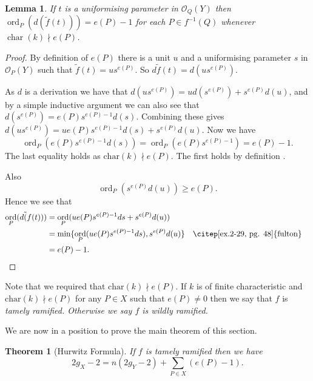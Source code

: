 \documentclass[11pt]{article} %
\newtheorem{thm}{Theorem}
\newtheorem{lem}{Lemma}
\DeclareMathOperator{\ord}{ord}
\DeclareMathOperator{\cha}{char}
\begin{document}
\begin{lem}
	If $t$ is a uniformising parameter in $\mathscr{O}_{Q}(Y)$ then $\ord_{P}(d(\tilde{f}(t)))=e(P)-1$ 	for each $P\in f^{-1}(Q)$ whenever $\cha(k)\nmid e(P)$.
\end{lem}
\begin{proof}
	By definition of $e(P)$ there is a unit $u$ and a uniformising parameter $s$ in $\mathscr{O}_{P}		(Y)$ such that $\tilde{f}(t)=us^{e(P)}$. So $d\tilde{f}(t)=d(us^{e(P)})$.

	As $d$ is a derivation we have that $d(us^{e(P)})=ud(s^{e(P)})+s^{e(P)}d(u)$, and by a simple 			inductive argument we can also see that $d(s^{e(P)})=e(P)s^{e(P)-1}d(s)$. Combining these gives 		$d(us^{e(P)})=ue(P)s^{e(P)-1}d(s)+s^{e(P)}d(u)$. Now we have
		\begin{equation}
			\ord_{P}\left(e(P)s^{e(P)-1}d(s)\right)= \ord_{P}(e(P)s^{e(P)-1})=e(P)-1.
		\end{equation}
	The last equality holds as $\mbox{char}(k)\nmid e(P)$. The first holds by definition \citep[pg. 207]{fulton}.

	Also
		\begin{equation}
			\ord_{P}(s^{e(P)}d(u))\geq e(P).
		\end{equation}
	Hence we see that
		\begin{align*}
			\ord_{P}(d\tilde({f}(t))) & = \ord_{P}(ue(P)s^{e(P)-1}ds+s^{e(P)}d(u)) \\
			& =  \mbox{min}\{ \ord_{P}(ue(P)s^{e(P)-1}ds),s^{e(P)}d(u) \} && \mbox{\citep[ex.2-29, pg. 48]{fulton}}\\
			& = e(P)-1. \\
		\end{align*}
\end{proof}

Note that we required that $\mbox{char}(k)\nmid e(P)$. If $k$ is of finite characteristic and $\mbox{char}(k)\nmid e(P)$ 
for any $P\in X$ such that $e(P)\neq 0$ then we say that $f$ is \em tamely ramified\em. Otherwise we say $f$ is 
\em wildly ramified\em.


We are now in a position to prove the main theorem of this section.\\

\begin{thm}[Hurwitz Formula]
	If $f$ is tamely ramified then we have
		\begin{equation*}
			2g_{X}-2=n(2g_{Y}-2)+\sum_{P\in X}(e(P)-1).
		\end{equation*}
\end{thm}
\end{document}
